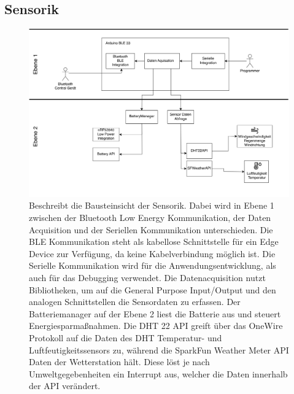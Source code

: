 \documentclass[
]{article}
\begin{document}
\subsection{Sensorik}
\begin{figure}[H]
	\centering
	\includegraphics[width=130mm]{resources/Bausteinschicht_Sara.png}
	\caption{Beschreibt die Bausteinsicht der Sensorik. Dabei wird in Ebene 1 zwischen der Bluetooth Low Energy Kommunikation, der Daten Acquisition und der Seriellen Kommunikation unterschieden. Die BLE Kommunikation steht als kabellose Schnittstelle für ein Edge Device zur Verfügung, da keine Kabelverbindung möglich ist. Die Serielle Kommunikation wird für die Anwendungsentwicklung, als auch für das Debugging verwendet. Die Datenacquisition nutzt Bibliotheken, um auf die General Purpose Input/Output und den analogen Schnittstellen die Sensordaten zu erfassen. Der Batteriemanager auf der Ebene 2 liest die Batterie aus und steuert Energiesparmaßnahmen. Die DHT 22 API greift über das OneWire Protokoll auf die Daten des DHT Temperatur- und Luftfeutigkeitssensors zu, während die SparkFun Weather Meter API Daten der Wetterstation hält. Diese löst je nach Umweltgegebenheiten ein Interrupt aus, welcher die Daten innerhalb der API verändert.}
	\label{fig:BausteinSensorik}
\end{figure}  
\end{document}
